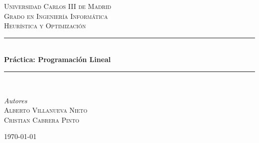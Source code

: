 \documentclass[11pt,spanish]{article}
\begin{document}



	\begin{titlepage} %
	
	\newcommand{\HRule}{\rule{\linewidth}{0.5mm}} %
	
	\center %
	
	
	\textsc{\LARGE Universidad Carlos III de Madrid}\\[1.5cm] %
	
	\textsc{\Large Grado en Ingeniería Informática}\\[0.5cm] %
	
	\textsc{\large Heurística y Optimización}\\[0.5cm] %
	
	
	\HRule\\[0.4cm]
	
	{\huge\bfseries Práctica: Programación Lineal}\\[0.4cm] %
	
	\HRule\\[1.5cm]
	
	
	\begin{minipage}{0.6\textwidth}
		\begin{flushleft}
			\large
			\textit{Autores}\\
			\textsc{Alberto Villanueva Nieto}\\
            \textsc{Cristian Cabrera Pinto}
		\end{flushleft}
	\end{minipage}

	
	\vfill\vfill\vfill %
	
	{\large\today} %
	
	\vfill %
	
	\end{titlepage}
	\newpage
	\tableofcontents
	\newpage
\end{document}
